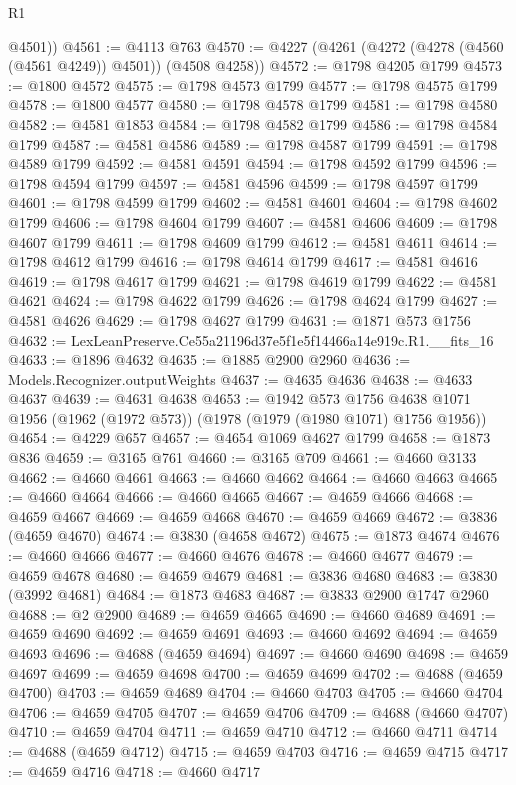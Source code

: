 \begin{lexlean}{R1}
\begin{coremodule}
        @4501))
@4561 := @4113 @763
@4570 := @4227 (@4261 (@4272 (@4278 (@4560 (@4561 @4249)) @4501)) (@4508 @4258))
@4572 := @1798 @4205 @1799
@4573 := @1800 @4572
@4575 := @1798 @4573 @1799
@4577 := @1798 @4575 @1799
@4578 := @1800 @4577
@4580 := @1798 @4578 @1799
@4581 := @1798 @4580
@4582 := @4581 @1853
@4584 := @1798 @4582 @1799
@4586 := @1798 @4584 @1799
@4587 := @4581 @4586
@4589 := @1798 @4587 @1799
@4591 := @1798 @4589 @1799
@4592 := @4581 @4591
@4594 := @1798 @4592 @1799
@4596 := @1798 @4594 @1799
@4597 := @4581 @4596
@4599 := @1798 @4597 @1799
@4601 := @1798 @4599 @1799
@4602 := @4581 @4601
@4604 := @1798 @4602 @1799
@4606 := @1798 @4604 @1799
@4607 := @4581 @4606
@4609 := @1798 @4607 @1799
@4611 := @1798 @4609 @1799
@4612 := @4581 @4611
@4614 := @1798 @4612 @1799
@4616 := @1798 @4614 @1799
@4617 := @4581 @4616
@4619 := @1798 @4617 @1799
@4621 := @1798 @4619 @1799
@4622 := @4581 @4621
@4624 := @1798 @4622 @1799
@4626 := @1798 @4624 @1799
@4627 := @4581 @4626
@4629 := @1798 @4627 @1799
@4631 := @1871 @573 @1756
@4632 := LexLeanPreserve.Ce55a21196d37e5f1e5f14466a14e919c.R1.__fits_16
@4633 := @1896 @4632
@4635 := @1885 @2900 @2960
@4636 := Models.Recognizer.outputWeights
@4637 := @4635 @4636
@4638 := @4633 @4637
@4639 := @4631 @4638
@4653 := @1942
    @573
    @1756
    @4638
    @1071
    @1956
    (@1962 (@1972 @573))
    (@1978 (@1979 (@1980 @1071) @1756 @1956))
@4654 := @4229 @657
@4657 := @4654 @1069 @4627 @1799
@4658 := @1873 @836
@4659 := @3165 @761
@4660 := @3165 @709
@4661 := @4660 @3133
@4662 := @4660 @4661
@4663 := @4660 @4662
@4664 := @4660 @4663
@4665 := @4660 @4664
@4666 := @4660 @4665
@4667 := @4659 @4666
@4668 := @4659 @4667
@4669 := @4659 @4668
@4670 := @4659 @4669
@4672 := @3836 (@4659 @4670)
@4674 := @3830 (@4658 @4672)
@4675 := @1873 @4674
@4676 := @4660 @4666
@4677 := @4660 @4676
@4678 := @4660 @4677
@4679 := @4659 @4678
@4680 := @4659 @4679
@4681 := @3836 @4680
@4683 := @3830 (@3992 @4681)
@4684 := @1873 @4683
@4687 := @3833 @2900 @1747 @2960
@4688 := @2 @2900
@4689 := @4659 @4665
@4690 := @4660 @4689
@4691 := @4659 @4690
@4692 := @4659 @4691
@4693 := @4660 @4692
@4694 := @4659 @4693
@4696 := @4688 (@4659 @4694)
@4697 := @4660 @4690
@4698 := @4659 @4697
@4699 := @4659 @4698
@4700 := @4659 @4699
@4702 := @4688 (@4659 @4700)
@4703 := @4659 @4689
@4704 := @4660 @4703
@4705 := @4660 @4704
@4706 := @4659 @4705
@4707 := @4659 @4706
@4709 := @4688 (@4660 @4707)
@4710 := @4659 @4704
@4711 := @4659 @4710
@4712 := @4660 @4711
@4714 := @4688 (@4659 @4712)
@4715 := @4659 @4703
@4716 := @4659 @4715
@4717 := @4659 @4716
@4718 := @4660 @4717

\end{coremodule}
\end{lexlean}
